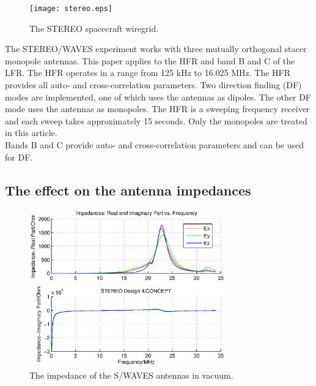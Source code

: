 \documentclass[draft,ras]{agutex}
\begin{document}
\begin{article}
\begin{figure}
\noindent\texttt{[image: stereo.eps]}
  \caption{The STEREO spacecraft wiregrid.}\label{fig:stereo}
\end{figure}

The STEREO/WAVES experiment works with three mutually orthogonal stacer
monopole antennas. This paper applies to the HFR and band B and C of the LFR. The HFR operates in a range from 125 kHz to 16.025 MHz. The HFR provides all auto- and cross-correlation parameters. Two direction finding (DF) modes are implemented, one of which uses the antennas as dipoles. The other DF mode uses the antennas as monopoles. The HFR is a sweeping frequency receiver and each sweep takes approximately 15 seconds. Only the monopoles are treated in this article.\\

Bands B and C provide auto- and cross-correlation parameters and can be used
for DF.\\
\subsection{The effect on the antenna impedances}

\begin{figure}
 \noindent\includegraphics[width=20pc]{impedance_stereo_vac.eps}
  \caption{The impedance of the S/WAVES antennas in vacuum.}\label{fig:imp_stereo_real}
\end{figure}


\end{article}
\end{document}
